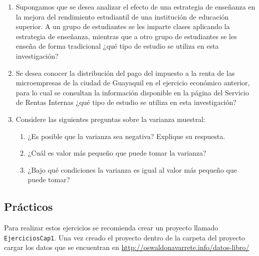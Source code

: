 \documentclass[
]{krantz}
\providecommand{\tightlist}{%
  \setlength{\itemsep}{0pt}\setlength{\parskip}{0pt}}
\begin{document}
\begin{enumerate}
\def\labelenumi{\arabic{enumi}.}
\item
  Supongamos que se desea analizar el efecto de una estrategia de enseñanza en la mejora del rendimiento estudiantil de una institución de educación superior. A un grupo de estudiantes se les imparte clases aplicando la estrategia de enseñanza, mientras que a otro grupo de estudiantes se les enseña de forma tradicional ¿qué tipo de estudio se utiliza en esta investigación?
\item
  Se desea conocer la distribución del pago del impuesto a la renta de las microempresas de la ciudad de Guayaquil en el ejercicio económico anterior, para lo cual se consultan la información disponible en la página del Servicio de Rentas Internas ¿qué tipo de estudio se utiliza en esta investigación?
\item
  Considere las siguientes preguntas sobre la varianza muestral:

  \begin{enumerate}
  \def\labelenumii{\alph{enumii}.}
  \tightlist
  \item
    ¿Es posible que la varianza sea negativa? Explique su respuesta.
  \item
    ¿Cuál es valor más pequeño que puede tomar la varianza?
  \item
    ¿Bajo qué condiciones la varianza es igual al valor más pequeño que puede tomar?
  \end{enumerate}
\end{enumerate}

\hypertarget{practicos}{%
\subsection{Prácticos}\label{practicos}}

Para realizar estos ejercicios se recomienda crear un proyecto llamado \texttt{EjerciciosCap1}. Una vez creado el proyecto dentro de la carpeta del proyecto cargar los datos que se encuentran en \url{http://oswaldonavarrete.info/datos-libro/}
\end{document}
